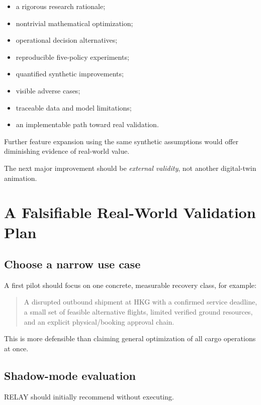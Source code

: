 \documentclass[10pt,a4paper]{article}
\theoremstyle{plain}
\theoremstyle{definition}
\theoremstyle{remark}
\begin{document}
\begin{itemize}[leftmargin=18pt,itemsep=2pt]
\item
a rigorous research rationale;
\item
nontrivial mathematical optimization;
\item
operational decision alternatives;
\item
reproducible five-policy experiments;
\item
quantified synthetic improvements;
\item
visible adverse cases;
\item
traceable data and model limitations;
\item
an implementable path toward real validation.
\end{itemize}

Further feature expansion using
the same synthetic assumptions
would offer diminishing evidence
of real-world value.

The next major improvement should be
\emph{external validity},
not another digital-twin animation.

\section{A Falsifiable Real-World Validation Plan}

\subsection{Choose a narrow use case}

A first pilot should focus on
one concrete, measurable recovery class,
for example:

\begin{quote}
\small
A disrupted outbound shipment at HKG
with a confirmed service deadline,
a small set of feasible alternative flights,
limited verified ground resources,
and an explicit physical/booking approval chain.
\end{quote}

This is more defensible than
claiming general optimization of
all cargo operations at once.

\subsection{Shadow-mode evaluation}

RELAY should initially recommend
without executing.
\end{document}
